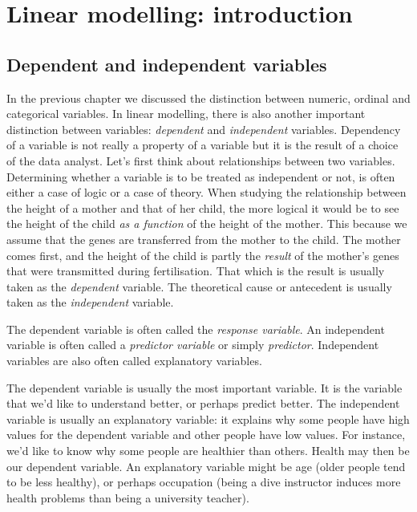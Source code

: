 \documentclass[]{book}\usepackage[]{graphicx}\usepackage[]{color}
\begin{document}


\chapter{Linear modelling: introduction}\label{chap:simple}



\section{Dependent and independent variables}
In the previous chapter we discussed the distinction between numeric, ordinal and categorical variables. In linear modelling, there is also another important distinction between variables: \textit{dependent} and \textit{independent} variables. Dependency of a variable is not really a property of a variable but it is the result of a choice of the data analyst. Let's first think about relationships between two variables. Determining whether a variable is to be treated as independent or not, is often either a case of logic or a case of theory. When studying the relationship between the height of a mother and that of her child, the more logical it would be to see the height of the child \textit{as a function} of the height of the mother. This because we assume that the genes are transferred from the mother to the child. The mother comes first, and the height of the child is partly the \textit{result} of the mother's genes that were transmitted during fertilisation. That which is the result is usually taken as the \textit{dependent} variable. The theoretical cause or antecedent is usually taken as the \textit{independent} variable. 

The dependent variable is often called the \textit{response variable}. An independent variable is often called a \textit{predictor variable} or simply \textit{predictor}. Independent variables are also often called explanatory variables.

The dependent variable is usually the most important variable. It is the variable that we'd like to understand better, or perhaps predict better. The independent variable is usually an explanatory variable: it explains why some people have high values for the dependent variable and other people have low values. For instance, we'd like to know why some people are healthier than others. Health may then be our dependent variable. An explanatory variable might be age (older people tend to be less healthy), or perhaps occupation (being a dive instructor induces more health problems than being a university teacher). 
\end{document}

